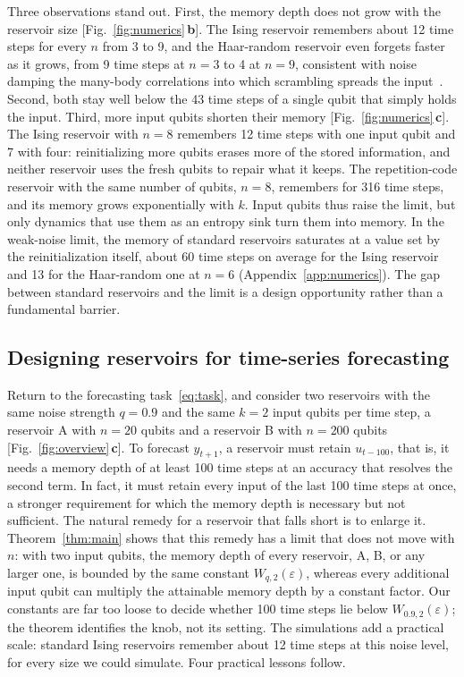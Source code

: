 \documentclass[aps,pra,reprint,superscriptaddress,floatfix]{revtex4-2}
\theoremstyle{plain}
\newcommand{\pnl}[1]{\textsf{\textbf{#1}}}
\begin{document}
Three observations stand out. First, the memory depth does not grow with the reservoir size [Fig.~\ref{fig:numerics}\,\pnl{b}]. The Ising reservoir remembers about 12 time steps for every $n$ from 3 to 9, and the Haar-random reservoir even forgets faster as it grows, from 9 time steps at $n=3$ to 4 at $n=9$, consistent with noise damping the many-body correlations into which scrambling spreads the input~\cite{Mele2026,Xiong2025}. Second, both stay well below the 43 time steps of a single qubit that simply holds the input. Third, more input qubits shorten their memory [Fig.~\ref{fig:numerics}\,\pnl{c}]. The Ising reservoir with $n=8$ remembers 12 time steps with one input qubit and 7 with four: reinitializing more qubits erases more of the stored information, and neither reservoir uses the fresh qubits to repair what it keeps. The repetition-code reservoir with the same number of qubits, $n=8$, remembers for 316 time steps, and its memory grows exponentially with $k$. Input qubits thus raise the limit, but only dynamics that use them as an entropy sink turn them into memory. In the weak-noise limit, the memory of standard reservoirs saturates at a value set by the reinitialization itself, about 60 time steps on average for the Ising reservoir and 13 for the Haar-random one at $n=6$ (Appendix~\ref{app:numerics}). The gap between standard reservoirs and the limit is a design opportunity rather than a fundamental barrier.

\subsection{Designing reservoirs for time-series forecasting}

Return to the forecasting task~\eqref{eq:task}, and consider two reservoirs with the same noise strength $q=0.9$ and the same $k=2$ input qubits per time step, a reservoir A with $n=20$ qubits and a reservoir B with $n=200$ qubits [Fig.~\ref{fig:overview}\,\pnl{c}]. To forecast $y_{t+1}$, a reservoir must retain $u_{t-100}$, that is, it needs a memory depth of at least 100 time steps at an accuracy that resolves the second term. In fact, it must retain every input of the last 100 time steps at once, a stronger requirement for which the memory depth is necessary but not sufficient. The natural remedy for a reservoir that falls short is to enlarge it. Theorem~\ref{thm:main} shows that this remedy has a limit that does not move with $n$: with two input qubits, the memory depth of every reservoir, A, B, or any larger one, is bounded by the same constant $W_{q,2}(\varepsilon)$, whereas every additional input qubit can multiply the attainable memory depth by a constant factor. Our constants are far too loose to decide whether 100 time steps lie below $W_{0.9,2}(\varepsilon)$; the theorem identifies the knob, not its setting. The simulations add a practical scale: standard Ising reservoirs remember about 12 time steps at this noise level, for every size we could simulate. Four practical lessons follow.
\end{document}
